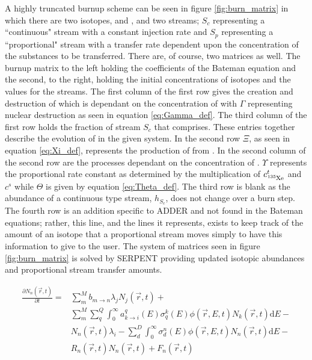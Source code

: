 \documentclass[]{elsarticle}
\begin{document}
A highly truncated burnup scheme can be
seen in figure \ref{fig:burn_matrix} in which there are two isotopes,
 and , and two streams; $S_{c}$ representing a
``continuous" stream with a constant injection rate and $S_{p}$ representing a
``proportional" stream with a transfer rate dependent upon the concentration
of the substances to be transferred. There are, of course, two matrices as well.
The burnup matrix to the left holding the coefficients of the Bateman equation
and the second, to the right, holding the initial concentrations of isotopes
and the values for the streams. The first column of the first row gives
the creation and destruction of  which is dependant on the
concentration of  with $\Gamma$ representing nuclear destruction as
seen in equation \ref{eq:Gamma_def}. The third column of the first row holds
the fraction of stream $S_{c}$ that  comprises. These entries
together describe the evolution of  in the given system. In the
second row $\Xi$, as seen in equation \ref{eq:Xi_def}, represents the production
of  from . In the second column of the second row are
the processes dependant on the concentration of . $\Upsilon$
represents the proportional rate constant as determined by the multiplication
of $c_{\ce{^{135}Xe}}^{t}$ and $c^{s}$ while $\Theta$ is given by equation
\ref{eq:Theta_def}. The third row is blank as the abundance of a continuous type
stream, $h_{S_{c}}$, does not change over a burn step. The fourth row is an
addition specific to ADDER and not found in the Bateman equations; rather, this
line, and the lines it represents, exists to keep track of the amount of an
isotope that a proportional stream moves simply to have this information to give
to the user. The system of matrices seen in figure \ref{fig:burn_matrix} is
solved by SERPENT providing updated isotopic abundances and proportional stream
transfer amounts.

    \begin{equation}
    \label{eq:Bateman}
    \begin{split}
        \frac{\partial N_{n}(\vec{r},t)}{\partial t} = & \sum \limits_{m}^{M} 
        b_{m \rightarrow n} \lambda_{j} N_{j}(\vec{r}, t) + \\
        & \sum \limits_{m}^{M}
        \sum \limits_{q}^{Q} \int_{0}^{\infty} a_{k \rightarrow i}^{q}(E)
        \sigma_{q}^{k}(E) \phi(\vec{r},E,t) N_{k}(\vec{r},t)\mathrm{d}E - \\
        & N_{n}(\vec{r},t) \lambda_{i} - \sum \limits_{d}^{D} \int_{0}^{\infty}
        \sigma_{d}^{n}(E) \phi(\vec{r},E,t) N_{n}(\vec{r},t)\mathrm{d}E - \\
        & R_{n}(\vec{r},t) N_{n}(\vec{r},t) + F_{n}(\vec{r},t)
    \end{split}
    \end{equation}
\end{document}
